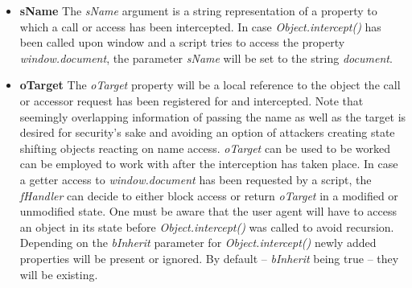     \begin{itemize}
      \item \textbf{sName} The \textit{sName} argument is a string representation of a property to which a call or access has been intercepted. In case \textit{Object.intercept()} has been called upon window and a script tries to access the property \textit{window.document}, the parameter \textit{sName} will be set to the string \textit{document}.
      \item \textbf{oTarget} The \textit{oTarget} property will be a local reference to the object the call or accessor request has been registered for and intercepted. Note that seemingly overlapping information of passing the name as well as the target is desired for security's sake and avoiding an option of attackers creating state shifting objects reacting on name access. \textit{oTarget} can be used to be worked can be employed to work with after the interception has taken place. In case a getter access to \textit{window.document} has been requested by a script, the \textit{fHandler} can decide to either block access or return \textit{oTarget} in a modified or unmodified state. One must be aware that the user agent will have to access an object in its state before \textit{Object.intercept()} was called to avoid recursion. Depending on the \textit{bInherit} parameter for \textit{Object.intercept()} newly added properties will be present or ignored. By default -- \textit{bInherit} being true -- they will be existing.

\end{itemize}
